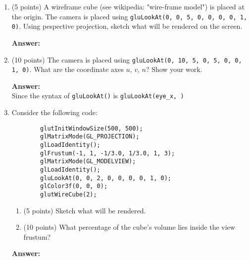\documentclass[13pt]{letter}
\begin{document}
\begin{enumerate}
$$  \right] $$
  $$ M = \left[
  \begin{array}{ccc}
     \cos{90} &  \sin{90} & x \\
    -\sin{90} &  \cos{90} & 0 \\
            0 &         0 & 1
  \end{array}
  \right]
  \left[
  \begin{array}{ccc}
    1 &  0 & -x \\
    0 &  1 & -y \\
    0 &  0 &  1
  \end{array}
  \right]
  $$
  $$ M = \left[
  \begin{array}{ccc}
     \cos{90} &  \sin{90} & -x\cos{90} - y\sin{90} + x \\
    -\sin{90} &  \cos{90} &  x\sin{90} - y\cos{90} \\
            0 &         0 & 1
  \end{array}
  \right] $$
	\vspace{13pt}
	
	\item (5 points)
	A wireframe cube (see wikipedia: "wire-frame model") is placed at the origin. The camera is placed using \texttt{gluLookAt(0, 0, 5, 0, 0, 0, 0, 1, 0)}. Using pespective projection, sketch what will be rendered on the screen.
	
	\textbf{Answer:} \\
	

	\vspace{13pt}

	\item (10 points)
	The camera is placed using \texttt{gluLookAt(0, 10, 5, 0, 5, 0, 0, 1, 0)}. What are the coordinate axes $u$, $v$, $n$? Show your work.

  \textbf{Answer:} \\
  Since the syntax of \texttt{gluLookAt()} is \texttt{gluLookAt(eye_x, )}
  
	\vspace{13pt}

	\item 
	Consider the following code:
	
	\begin{verbatim}
		glutInitWindowSize(500, 500);
		glMatrixMode(GL_PROJECTION);
		glLoadIdentity();
		glFrustum(-1, 1, -1/3.0, 1/3.0, 1, 3);
		glMatrixMode(GL_MODELVIEW);
		glLoadIdentity();
		gluLookAt(0, 0, 2, 0, 0, 0, 0, 1, 0);
		glColor3f(0, 0, 0);
		glutWireCube(2);
	\end{verbatim}
	\begin{enumerate}
		\item (5 points)
		Sketch what will be rendered.

		\item (10 points) 
		What percentage of the cube’s volume lies inside the view frustum?
	
	\end{enumerate}
	
	\textbf{Answer:} \\
\end{enumerate}
\end{document}
